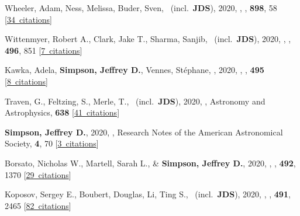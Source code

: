 \item[{\color{numcolor}\scriptsize46}] Wheeler, Adam, Ness, Melissa, Buder, Sven, \etal\ (incl.\ \textbf{JDS}), 2020, , \apj, \textbf{898}, 58 [\href{https://ui.adsabs.harvard.edu/#abs/2020ApJ...898...58W}{34~citations}]

\item[{\color{numcolor}\scriptsize45}] Wittenmyer, Robert A., Clark, Jake T., Sharma, Sanjib, \etal\ (incl.\ \textbf{JDS}), 2020, , \mnras, \textbf{496}, 851 [\href{https://ui.adsabs.harvard.edu/#abs/2020MNRAS.496..851W}{7~citations}]

\item[{\color{numcolor}\scriptsize44}] Kawka, Adela, \textbf{Simpson, Jeffrey D.}, Vennes, St{\'e}phane, \etal, 2020, , \mnras, \textbf{495} [\href{https://ui.adsabs.harvard.edu/#abs/2020MNRAS.495L.129K}{8~citations}]

\item[{\color{numcolor}\scriptsize43}] Traven, G., Feltzing, S., Merle, T., \etal\ (incl.\ \textbf{JDS}), 2020, , Astronomy and Astrophysics, \textbf{638} [\href{https://ui.adsabs.harvard.edu/#abs/2020A&A...638A.145T}{41~citations}]

\item[{\color{numcolor}\scriptsize42}] \textbf{Simpson, Jeffrey D.}, 2020, , Research Notes of the American Astronomical Society, \textbf{4}, 70 [\href{https://ui.adsabs.harvard.edu/#abs/2020RNAAS...4...70S}{3~citations}]

\item[{\color{numcolor}\scriptsize41}] Borsato, Nicholas W., Martell, Sarah L., \& \textbf{Simpson, Jeffrey D.}, 2020, , \mnras, \textbf{492}, 1370 [\href{https://ui.adsabs.harvard.edu/#abs/2020MNRAS.492.1370B}{29~citations}]

\item[{\color{numcolor}\scriptsize40}] Koposov, Sergey E., Boubert, Douglas, Li, Ting S., \etal\ (incl.\ \textbf{JDS}), 2020, , \mnras, \textbf{491}, 2465 [\href{https://ui.adsabs.harvard.edu/#abs/2020MNRAS.491.2465K}{82~citations}]

